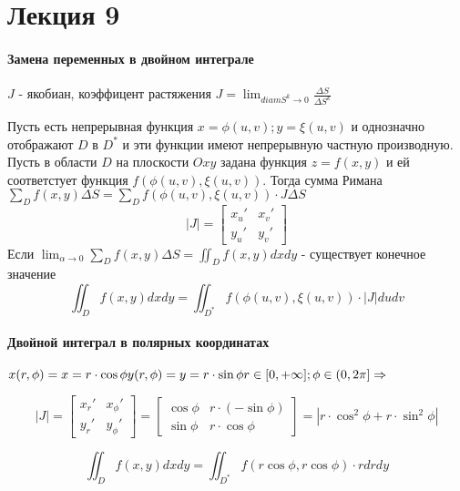 \chapter{Лекция 9}
\subsubsection{Замена переменных в двойном интеграле}
$J$ - якобиан, коэффицент растяжения 
$J = \lim_{diam S^k \rightarrow 0} \frac{\Delta S}{\Delta S^k}$

Пусть есть непрерывная функция $x = \phi(u, v); y = \xi (u,v)$ и однозначно отображают $D $ в $D^*$ и эти функции имеют непрерывную частную производную. 
Пусть в области $D$ на плоскости $Oxy$ задана функция $z = f(x,y)$ и ей соответстует функция $f(\phi(u,v), \xi(u,v))$. Тогда сумма Римана $\sum_D f(x,y) \Delta S = \sum_D f(\phi(u,v), \xi(u,v)) \cdot J \Delta S $
$$|J| = \begin{bmatrix}
    x_u' & x_v' \\ 
    y_u' & y_v'
\end{bmatrix}$$
Если $\lim_{\alpha \rightarrow 0} \sum_D f(x,y)\Delta S = \iint_D f(x,y) dxdy$ - существует конечное значение 
$$
\iint_D f(x,y) dxdy = \iint_{D^*} f(\phi(u,v), \xi(u,v)) \cdot |J| dudv
$$

\subsubsection{Двойной интеграл в полярных координатах}

$\\ x(r, \phi) = x = r\cdot \cos \phi \\ y(r, \phi) = y = r \cdot \sin \phi \\ r \in [0, +\infty]; \phi \in (0, 2\pi] \Rightarrow $

$$ |J| = 
\begin{bmatrix}
    x_r' & x_\phi' \\ 
    y_r' & y_\phi'
\end{bmatrix} = \begin{bmatrix}
    \cos \phi & r\cdot(-\sin \phi) \\ 
    \sin \phi & r\cdot \cos \phi
\end{bmatrix} = |r\cdot \cos^2 \phi + r \cdot \sin^2 \phi| 
$$

$$
\iint_D f(x,y) dxdy = \iint_{D^*} f(r\cos \phi, r\cos\phi) \cdot r drdy
$$

